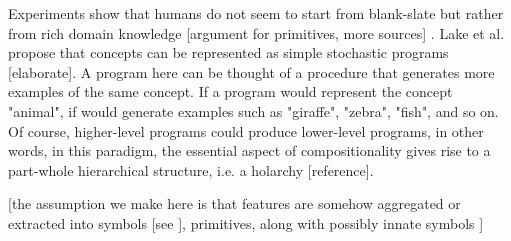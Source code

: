 Experiments show that humans do not seem to start from blank-slate but rather from rich domain knowledge [argument for primitives, more sources] \cite{lake_building_2016}. Lake et al. propose that concepts can be represented as simple stochastic programs [elaborate]. A program here can be thought of a procedure that generates more examples of the same concept. If a program would represent the concept "animal", if would generate examples such as "giraffe", "zebra", "fish", and so on. Of course, higher-level programs could produce lower-level programs, in other words, in this paradigm, the essential aspect of compositionality gives rise to a part-whole hierarchical structure, i.e. a holarchy [reference].

[the assumption we make here is that features are somehow aggregated or extracted into symbols [see \cite{garcez_neurosymbolic_2020}], primitives, along with possibly innate symbols \cite{Lake_Ullman_Tenenbaum_Gershman_2017}] 



